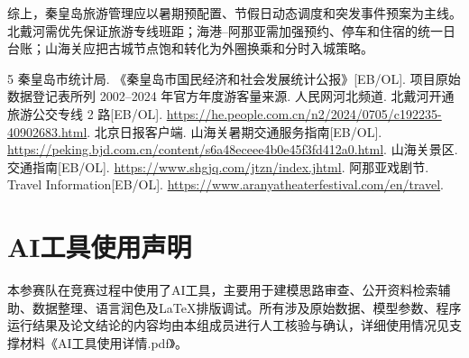 \documentclass[withoutpreface,bwprint]{cumcmthesis}
\begin{document}
综上，秦皇岛旅游管理应以暑期预配置、节假日动态调度和突发事件预案为主线。北戴河需优先保证旅游专线班距；海港--阿那亚需加强预约、停车和住宿的统一日台账；山海关应把古城节点饱和转化为外圈换乘和分时入城策略。


\begin{thebibliography}{5}
 秦皇岛市统计局. 《秦皇岛市国民经济和社会发展统计公报》[EB/OL]. 项目原始数据登记表所列 2002--2024 年官方年度游客量来源.
 人民网河北频道. 北戴河开通旅游公交专线 2 路[EB/OL]. \url{https://he.people.com.cn/n2/2024/0705/c192235-40902683.html}.
 北京日报客户端. 山海关暑期交通服务指南[EB/OL]. \url{https://peking.bjd.com.cn/content/s6a48eceee4b0e45f3fd412a0.html}.
 山海关景区. 交通指南[EB/OL]. \url{https://www.shgjq.com/jtzn/index.jhtml}.
 阿那亚戏剧节. Travel Information[EB/OL]. \url{https://www.aranyatheaterfestival.com/en/travel}.
\end{thebibliography}

\clearpage
\section*{AI工具使用声明}
本参赛队在竞赛过程中使用了AI工具，主要用于建模思路审查、公开资料检索辅助、数据整理、语言润色及LaTeX排版调试。所有涉及原始数据、模型参数、程序运行结果及论文结论的内容均由本组成员进行人工核验与确认，详细使用情况见支撑材料《AI工具使用详情.pdf》。

\begin{appendices}


\end{appendices}
\end{document}
